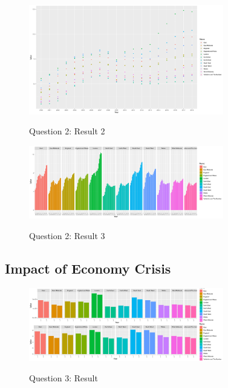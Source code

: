 \documentclass{article}
\begin{document}
\begin{figure}[htb]
  \begin{minipage}[b]{1.0\linewidth}
    \centering
    \centerline{\includegraphics[width=8.5cm]{Q2Geom_point}}
    \centerline{Question 2: Result 2}\medskip
  \end{minipage}
\end{figure}

\begin{figure}[htb]
  \begin{minipage}[b]{1.0\linewidth}
    \centering
    \centerline{\includegraphics[width=8.5cm]{Q2Geom_gridbar}}
    \centerline{Question 2: Result 3}\medskip
  \end{minipage}
\end{figure}

\subsection{Impact of Economy Crisis}


\begin{figure}[htb]
  \begin{minipage}[b]{1.0\linewidth}
    \centering
    \centerline{\includegraphics[width=8.5cm]{Q3Geom_gridbar}}
    \centerline{Question 3: Result}\medskip
  \end{minipage}
\end{figure}
\end{document}
